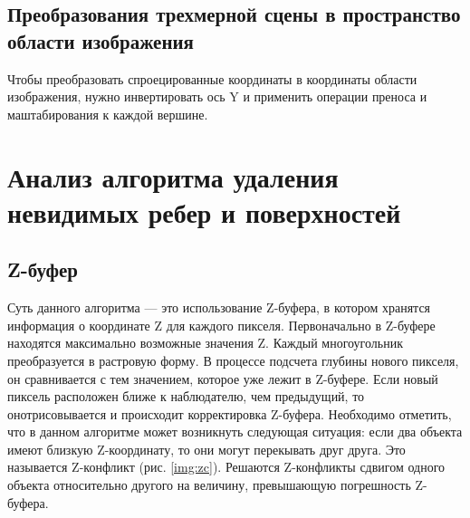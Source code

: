 \subsection{Преобразования трехмерной сцены в пространство области изображения}
Чтобы преобразовать спроецированные координаты в координаты области изображения, нужно инвертировать ось Y и  применить операции преноса и маштабирования к каждой вершине.

\section{Анализ алгоритма удаления невидимых ребер и поверхностей}
\subsection{Z-буфер}
Суть данного алгоритма --- это использование Z-буфера, в котором хранятся информация о координате Z для каждого пикселя.
Первоначально в Z-буфере находятся максимально возможные значения Z. Каждый многоугольник преобразуется в растровую форму.
В процессе подсчета глубины нового пикселя, он сравнивается с тем значением, которое уже лежит в Z-буфере. Если новый пиксель расположен ближе к наблюдателю, чем предыдущий, то онотрисовывается и происходит корректировка Z-буфера. Необходимо отметить, что в данном алгоритме может возникнуть следующая ситуация: если два объекта имеют близкую Z-координату, то они могут перекывать друг друга. Это называется Z-конфликт (рис. \ref{img:zc}). Решаются Z-конфликты сдвигом одного объекта относительно другого на величину, превышающую погрешность Z-буфера.
\begin{center}
	\label{img:zc}
\end{center}

